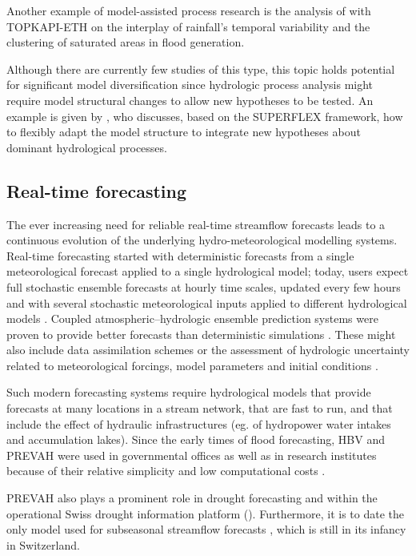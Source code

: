 \documentclass[10pt,a4paper]{article}
\begin{document}
Another example of model-assisted process research is the analysis of \citet{Paschalis_2014} with TOPKAPI-ETH on the interplay of rainfall's temporal variability and the clustering of saturated areas in flood generation.

Although there are currently few studies of this type, this topic holds potential for significant model diversification since hydrologic process analysis might require model structural changes to allow new hypotheses to be tested. An example is given by \citet{DalMolin2020}, who discusses, based on the SUPERFLEX framework, how to flexibly adapt the model structure to integrate new hypotheses about dominant hydrological processes.

\subsection{Real-time forecasting}
\label{sec:application:forecasting}

The ever increasing need for reliable real-time streamflow forecasts leads to a continuous evolution of the underlying hydro-meteorological modelling systems. Real-time forecasting started with deterministic forecasts from a single meteorological forecast applied to a single hydrological model; today, users expect full stochastic ensemble forecasts at hourly time scales, updated every few hours and with several stochastic meteorological inputs applied to different hydrological models \citep{Karsten2016}. Coupled atmospheric--hydrologic ensemble prediction systems were proven to provide better forecasts than deterministic simulations \citep{Verbunt2007,Zappa2008,Jaun2008a,Liechti2013}. These might also include data assimilation schemes \citep{J_rg_Hess_2015} or the assessment of hydrologic uncertainty related to meteorological forcings, model parameters and initial conditions \citep{Zappa2011a,Fundel2011}.

Such modern forecasting systems require hydrological models that provide forecasts at many locations in a stream network, that are fast to run, and that include the effect of hydraulic infrastructures (eg. of hydropower water intakes and accumulation lakes). Since the early times of flood forecasting, HBV and PREVAH were used in governmental offices \citep{Karsten2016} as well as in research institutes because of their relative simplicity and low computational costs \citep{Verbunt2006,Addor_2011,Murphy_2019,Antonetti2019}.

PREVAH also plays a prominent role in drought forecasting \citep{Fundel2013,J_rg_Hess_2015,Bogner2018b} and within the operational Swiss drought information platform (\citealp{Stahli2013}). Furthermore, it is to date the only model used for subseasonal streamflow forecasts \citep{Monhart_2019,Anghileri2019}, which is still in its infancy in Switzerland.
\end{document}
